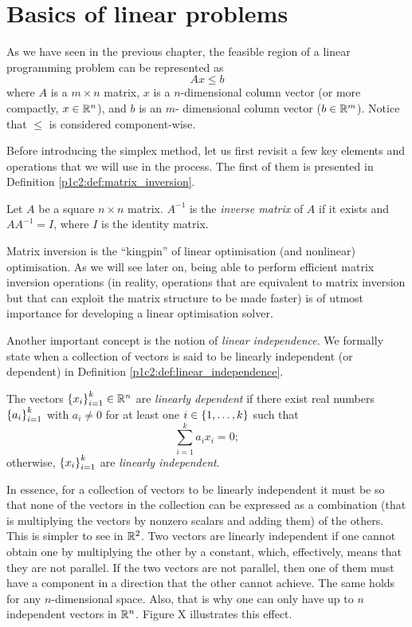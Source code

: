 \section{Basics of linear problems}

As we have seen in the previous chapter, the feasible region of a linear programming problem can be represented as
%
\begin{equation} \label{p1c2:eq:feasible_region_inequality}
	Ax \leq b	
\end{equation}
%
where $A$ is a $m \times n$ matrix, $x$ is a $n$-dimensional column vector (or more compactly, $x \in \mathbb{R}^n$), and $b$ is an $m$- dimensional column vector ($b \in \mathbb{R}^m$). Notice that $\leq$ is considered component-wise.

Before introducing the simplex method, let us first revisit a few key elements and operations that we will use in the process. The first of them is presented in Definition \ref{p1c2:def:matrix_inversion}.
%
\begin{definition} \label{p1c2:def:matrix_inversion}
	Let $A$ be a square $n \times n$ matrix. $A^{-1}$ is the \emph{inverse matrix} of $A$ if it exists and $AA^{-1} = I$, where $I$ is the identity matrix.
\end{definition}
%
Matrix inversion is the ``kingpin'' of linear optimisation (and nonlinear) optimisation. As we will see later on, being able to perform efficient matrix inversion operations (in reality, operations that are equivalent to matrix inversion but that can exploit the matrix structure to be made faster) is of utmost importance for developing a linear optimisation solver. 

Another important concept is the notion of \emph{linear independence}. We formally state when a collection of vectors is said to be linearly independent (or dependent) in Definition \ref{p1c2:def:linear_independence}. 

%
\begin{definition} \label{p1c2:def:linear_independence}
	The vectors $\left\{ x_i \right \}_{i=1}^k \in \mathbb{R}^n$  are \emph{linearly dependent} if there exist real numbers $\left\{ a_i \right \}_{i=1}^k$ with $a_i \neq 0$ for at least one $i \in \left\{ 1,\dots, k \right \}$ such that
	$$
		\sum_{i=1}^k a_i x_i= 0;
	$$
	otherwise, $\left\{ x_i \right \}_{i=1}^k$ are \emph{linearly independent}.
\end{definition}

In essence, for a collection of vectors to be linearly independent it must be so that none of the vectors in the collection can be expressed as a combination (that is multiplying the vectors by nonzero scalars and adding them) of the others. This is simpler to see in $\mathbb{R}^2$. Two vectors are linearly independent if one cannot obtain one by multiplying the other by a constant, which, effectively, means that they are not parallel. If the two vectors are not parallel, then one of them must have a component in a direction that the other cannot achieve. The same holds for any $n$-dimensional space. Also, that is why one can only have up to $n$ independent vectors in $\mathbb{R}^n$. Figure X illustrates this effect. 

